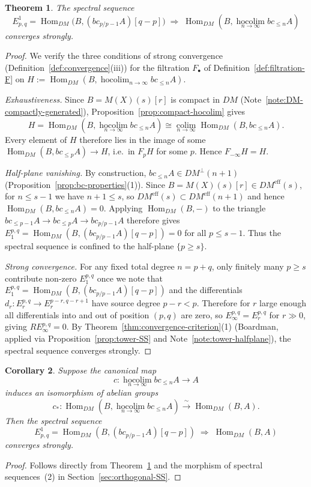 \documentclass[12pt,a4paper]{article}
\newtheorem{theorem}{Theorem}[section]
\newtheorem{corollary}[theorem]{Corollary}
\theoremstyle{definition}
\newcommand{\hocolim}{\operatorname*{hocolim}}
\newcommand{\colim}{\operatorname*{colim}}
\newcommand{\Hom}{\operatorname{Hom}}
\begin{document}
\begin{theorem}\label{thm:DM-strong-convergence}
The spectral sequence
\[
  E^1_{p,q} = \Hom_{DM}\!\bigl(B,(bc_{p/p-1}A)[q-p]\bigr)
  \;\Rightarrow\; \Hom_{DM}(B,\hocolim_{n\to\infty}bc_{\leq n}A)
\]
converges strongly.
\end{theorem}
\begin{proof}
We verify the three conditions of strong convergence
(Definition~\ref{def:convergence}(iii)) for the filtration $F_\bullet$ of
Definition~\ref{def:filtration-F} on $H:=\Hom_{DM}(B,\hocolim_{n\to\infty}bc_{\leq n}A)$.

\textit{Exhaustiveness.}  Since $B=M(X)(s)[r]$ is compact in $DM$
(Note~\ref{note:DM-compactly-generated}), Proposition~\ref{prop:compact-hocolim} gives
\[
  H = \Hom_{DM}(B,\hocolim_{n\to\infty}bc_{\leq n}A)
  \cong \colim_{n\to\infty}\Hom_{DM}(B,bc_{\leq n}A).
\]
Every element of $H$ therefore lies in the image of some
$\Hom_{DM}(B,bc_{\leq p}A)\to H$, i.e.\ in $F_p H$ for some $p$.
Hence $F_{-\infty}H = H$.

\textit{Half-plane vanishing.}  By construction,
$bc_{\leq n}A\in DM^\perp(n+1)$ (Proposition~\ref{prop:bc-properties}(1)).
Since $B=M(X)(s)[r]\in DM^{\mathrm{eff}}(s)$, for $n\leq s-1$ we have
$n+1\leq s$, so $DM^{\mathrm{eff}}(s)\subset DM^{\mathrm{eff}}(n+1)$ and hence
$\Hom_{DM}(B, bc_{\leq n}A)=0$.
Applying $\Hom_{DM}(B,-)$ to the triangle
$bc_{\leq p-1}A\to bc_{\leq p}A\to bc_{p/p-1}A$ therefore gives
$E_1^{p,q}=\Hom_{DM}(B,(bc_{p/p-1}A)[q-p])=0$ for all $p\leq s-1$.
Thus the spectral sequence is confined to the half-plane $\{p\geq s\}$.

\textit{Strong convergence.}  For any fixed total degree $n=p+q$, only finitely
many $p\geq s$ contribute non-zero $E_1^{p,q}$ once we note that
$E_1^{p,q}=\Hom_{DM}(B,(bc_{p/p-1}A)[q-p])$ and the differentials
$d_r:E_r^{p,q}\to E_r^{p-r,q-r+1}$ have source degree $p-r<p$.  Therefore for
$r$ large enough all differentials into and out of position $(p,q)$ are zero, so
$E_\infty^{p,q}=E_r^{p,q}$ for $r\gg 0$, giving $RE_\infty^{p,q}=0$.
By Theorem~\ref{thm:convergence-criterion}(1) (Boardman, applied via
Proposition~\ref{prop:tower-SS} and Note~\ref{note:tower-halfplane}), the spectral
sequence converges strongly.
\end{proof}

\begin{corollary}\label{cor:hocolim-iso}
Suppose the canonical map
\[
  c:\hocolim_{n\to\infty}bc_{\leq n}A\longrightarrow A
\]
induces an isomorphism of abelian groups
\[
  c_*:\Hom_{DM}(B,\hocolim_{n\to\infty}bc_{\leq n}A)\xrightarrow{\;\sim\;}
  \Hom_{DM}(B,A).
\]
Then the spectral sequence
\[
  E^1_{p,q} = \Hom_{DM}(B,(bc_{p/p-1}A)[q-p])\;\Rightarrow\;\Hom_{DM}(B,A)
\]
converges strongly.
\end{corollary}
\begin{proof}
Follows directly from Theorem~\ref{thm:DM-strong-convergence} and the morphism of
spectral sequences~(2) in Section~\ref{sec:orthogonal-SS}.
\end{proof}
\end{document}
